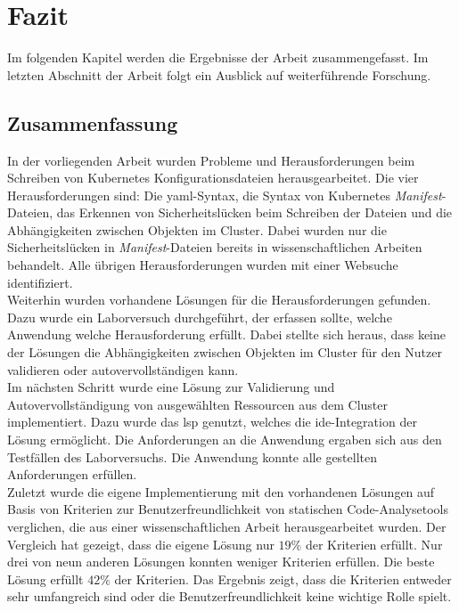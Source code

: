 \chapter{Fazit}\label{ch:conclusion}
Im folgenden Kapitel werden die Ergebnisse der Arbeit zusammengefasst. Im letzten Abschnitt
der Arbeit folgt ein Ausblick auf weiterführende Forschung.

\section{Zusammenfassung}

In der vorliegenden Arbeit wurden Probleme und Herausforderungen beim Schreiben
von Kubernetes Konfigurationsdateien herausgearbeitet.
Die vier Herausforderungen sind: Die \ac{yaml}-Syntax, die Syntax von Kubernetes \textit{Manifest}-Dateien,
das Erkennen von Sicherheitslücken beim Schreiben der Dateien und die Abhängigkeiten zwischen Objekten im Cluster.
Dabei wurden nur die Sicherheitslücken in \textit{Manifest}-Dateien bereits in wissenschaftlichen Arbeiten behandelt.
Alle übrigen Herausforderungen wurden mit einer Websuche identifiziert.
\\
Weiterhin wurden vorhandene Lösungen für die Herausforderungen gefunden.
Dazu wurde ein Laborversuch durchgeführt, der erfassen sollte, welche Anwendung welche Herausforderung erfüllt.
Dabei stellte sich heraus, dass keine der Lösungen die Abhängigkeiten zwischen Objekten im Cluster
für den Nutzer validieren oder autovervollständigen kann.
\\
Im nächsten Schritt wurde eine Lösung zur Validierung und Autovervollständigung von ausgewählten
Ressourcen aus dem Cluster implementiert. Dazu wurde das \ac{lsp} genutzt, welches die
\ac{ide}-Integration der Lösung ermöglicht.
Die Anforderungen an die Anwendung ergaben sich aus den Testfällen des Laborversuchs.
Die Anwendung konnte alle gestellten Anforderungen erfüllen.
\\
Zuletzt wurde die eigene Implementierung mit den vorhandenen Lösungen auf Basis
von Kriterien zur Benutzerfreundlichkeit von statischen Code-Analysetools verglichen, die aus einer wissenschaftlichen Arbeit herausgearbeitet
wurden. Der Vergleich hat gezeigt, dass die eigene Lösung nur $19\%$ der Kriterien erfüllt.
Nur drei von neun anderen Lösungen konnten weniger Kriterien erfüllen.
Die beste Lösung erfüllt $42\%$ der Kriterien.
Das Ergebnis zeigt, dass die Kriterien entweder sehr umfangreich sind oder die Benutzerfreundlichkeit
keine wichtige Rolle spielt.

